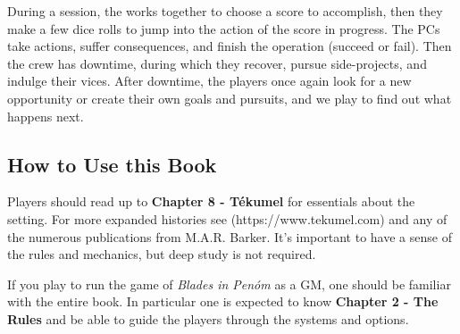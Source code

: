 During a session, the  works together to choose a score to accomplish, then they make a few dice rolls to jump into the action of the score in progress. The PCs take actions, suffer consequences, and finish the operation (succeed or fail). Then the crew has downtime, during which they recover, pursue side-projects, and indulge their vices. After downtime, the players once again look for a new opportunity or create their own goals and pursuits, and we play to find out what happens next.


\subsection{How to Use this Book}

Players should read up to \textbf{Chapter 8 - Tékumel} for essentials about the setting. For more expanded histories see (https://www.tekumel.com) and any of the numerous publications from M.A.R. Barker. It's important to have a sense of the rules and mechanics, but deep study is not required.

If you play to run the game of \emph{Blades in Penóm} as a GM, one should be familiar with the entire book. In particular one is expected to know \textbf{Chapter 2 - The Rules} and be able to guide the players through the systems and options.


